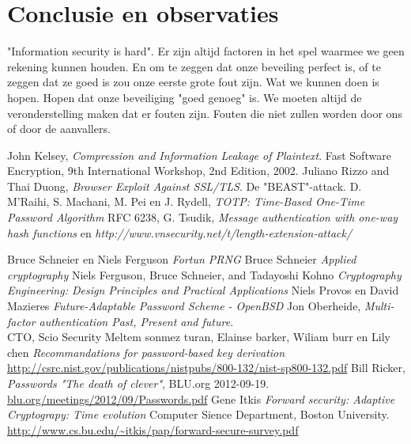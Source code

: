 \documentclass[11pt]{article}
\begin{document}
\section{Conclusie en observaties}
"Information security is hard". Er zijn altijd factoren in het spel waarmee we geen rekening kunnen houden. En om te zeggen dat onze beveiling perfect is, of te zeggen dat ze goed is zou onze eerste grote fout zijn. Wat we kunnen doen is hopen. Hopen dat onze beveiliging "goed genoeg" is. We moeten altijd de veronderstelling maken dat er fouten zijn. Fouten die niet zullen worden door ons of door de aanvallers.
\begin{thebibliography}{9}

  John Kelsey,
  \emph{{{C}ompression and {I}nformation {L}eakage of {P}laintext}}.
  Fast Software Encryption, 9th International Workshop,
  2nd Edition,
  2002.
	Juliano Rizzo and Thai Duong,
	\emph{Browser Exploit Against SSL/TLS}. De "BEAST"-attack.
	 D. M'Raihi,  S. Machani, M. Pei en  J. Rydell,
	 \emph{TOTP: Time-Based One-Time Password Algorithm}
	 RFC 6238,
	G. Tsudik,
	\emph{Message authentication with one-way hash functions} en
	\emph{http://www.vnsecurity.net/t/length-extension-attack/}
	
	Bruce Schneier en Niels Ferguson
	\emph{Fortun PRNG}
	Bruce Schneier
	\emph{Applied cryptography}
	Niels Ferguson, Bruce Schneier, and Tadayoshi Kohno
	\emph{Cryptography Engineering: Design Principles and Practical Applications}
	Niels Provos en David Mazieres
	\emph{Future-Adaptable Password Scheme - OpenBSD}
	Jon Oberheide,
	\emph{Multi-factor authentication Past, Present and future}.\\
	CTO, Scio Security
	Meltem sonmez turan, Elainse barker, Wiliam burr en Lily chen	
	\emph{Recommandations for password-based key derivation}\\
	\url{http://csrc.nist.gov/publications/nistpubs/800-132/nist-sp800-132.pdf}
	Bill Ricker,
	\emph{Passwords "The death of clever"}, 
	BLU.org 2012-09-19. \\
	\url{blu.org/meetings/2012/09/Passwords.pdf‎}
	Gene Itkis
	\emph{Forward security: Adaptive Cryptograpy: Time evolution}
	Computer Sience Department, Boston University.\\
	\url{http://www.cs.bu.edu/~itkis/pap/forward-secure-survey.pdf}
	
\end{thebibliography}
\end{document}
